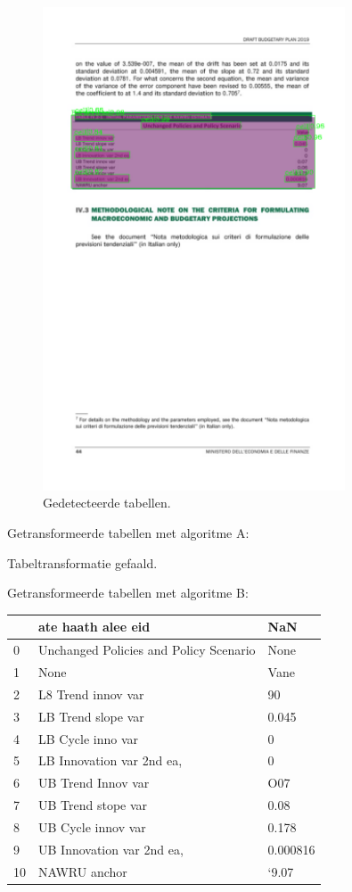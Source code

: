 \begin{figure}[H]
    \centering
    \includegraphics[width=0.8\textwidth]{test-resultaten/2/detected_tables.png}
    \caption{Gedetecteerde tabellen.}
\end{figure}

Getransformeerde tabellen met algoritme A:

Tabeltransformatie gefaald.

Getransformeerde tabellen met algoritme B:

\begin{tabular}{lll}
\toprule
{} &                      ate haath alee eid &       NaN \\
\midrule
0  &  Unchanged Policies and Policy Scenario &      None \\
1  &                                    None &      Vane \\
2  &                      L8 Trend innov var &        90 \\
3  &                      LB Trend slope var &     0.045 \\
4  &                       LB Cycle inno var &         0 \\
5  &               LB Innovation var 2nd ea, &         0 \\
6  &                      UB Trend Innov var &       O07 \\
7  &                      UB Trend stope var &      0.08 \\
8  &                      UB Cycle innov var &     0.178 \\
9  &               UB Innovation var 2nd ea, &  0.000816 \\
10 &                            NAWRU anchor &     ‘9.07 \\
\bottomrule
\end{tabular}
